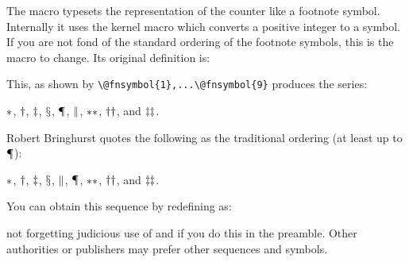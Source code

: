 The \cmd{\fnsymbol} macro typesets the representation of the 
counter  like a footnote symbol. 
Internally it uses the kernel \cmd{\@fnsymbol} macro which converts 
a positive integer  to a symbol. If you are not fond of
the standard ordering of the footnote 
symbols, this is the macro to change. Its
original definition is:
\begin{lcode}
\def\@fnsymbol#1{\ensuremath{%
  \ifcase#1\or *\or \dagger\or \ddagger\or 
  \mathsection\or \mathparagraph\or \|\or **\or 
  \dagger\dagger \or \ddagger\ddagger \else\@ctrerr\fi}}
\end{lcode}
\makeatletter
\let\m@mold@fnsymbol\@fnsymbol
\def\@fnsymbol#1{\ensuremath{%
  \ifcase#1\or *\or \dagger\or \ddagger\or 
  \mathsection\or \mathparagraph\or \|\or **\or 
  \dagger\dagger \or \ddagger\ddagger \else\@ctrerr\fi}}
\makeatother
This, as shown by \verb?\@fnsymbol{1},...\@fnsymbol{9}? produces the series:
\begin{center}
 \makeatletter
\@fnsymbol{1},
\@fnsymbol{2},
\@fnsymbol{3},
\@fnsymbol{4},
\@fnsymbol{5},
\@fnsymbol{6},
\@fnsymbol{7},
\@fnsymbol{8}, and
\@fnsymbol{9}.
\makeatother 
\end{center}

\makeatletter
\renewcommand*{\@fnsymbol}[1]{\ensuremath{%
  \ifcase#1\or *\or \dagger\or \ddagger\or
  \mathsection\or \|\or \mathparagraph\or **\or \dagger\dagger
  \or \ddagger\ddagger \else\@ctrerr\fi}}
\makeatother
    Robert Bringhurst quotes the following as the traditional 
ordering (at least up
to \makeatletter\@fnsymbol{6}\makeatother):
\begin{center}
 \makeatletter
\@fnsymbol{1},
\@fnsymbol{2},
\@fnsymbol{3},
\@fnsymbol{4},
\@fnsymbol{5},
\@fnsymbol{6},
\@fnsymbol{7},
\@fnsymbol{8}, and
\@fnsymbol{9}.
\makeatother 
\end{center}
You can obtain this sequence by redefining \cmd{\@fnsymbol} as:
\begin{lcode}
\renewcommand*{\@fnsymbol}[1]{\ensuremath{%
  \ifcase#1\or *\or \dagger\or \ddagger\or
  \mathsection\or \|\or \mathparagraph\or **\or \dagger\dagger
  \or \ddagger\ddagger \else\@ctrerr\fi}}
\end{lcode}
not forgetting judicious use of \cmd{\makeatletter} and \cmd{\makeatother}
if you do this in the preamble. Other authorities or publishers
may prefer other sequences and symbols.
\makeatletter\let\@fnsymbol\m@mold@fnsymbol\makeatother

